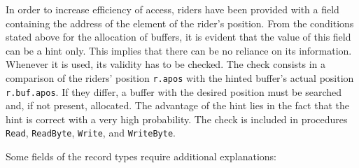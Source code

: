 In order to increase efficiency of access, riders have been provided with a field containing the address
of the element of the rider's position. From the conditions stated above for the allocation of buffers,
it is evident that the value of this field can be a hint only. This implies that there can be no
reliance on its information. Whenever it is used, its validity has to be checked. The check consists in
a comparison of the riders' position \verb|r.apos| with the hinted buffer's actual position
\verb|r.buf.apos|. If they differ, a buffer with the desired position must be searched and, if not
present, allocated. The advantage of the hint lies in the fact that the hint is correct with a very high
probability. The check is included in procedures \verb|Read|, \verb|ReadByte|, \verb|Write|, and
\verb|WriteByte|.

Some fields of the record types require additional explanations:

